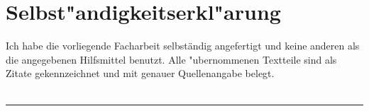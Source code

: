 \documentclass[12pt]{article}
\begin{document}
\section{Selbst"andigkeitserkl"arung}
Ich habe die vorliegende Facharbeit selbständig angefertigt und keine anderen als die angegebenen Hilfsmittel benutzt.
Alle "ubernommenen Textteile sind als Zitate gekennzeichnet und mit genauer Quellenangabe belegt. \\~\\
\rule{0.3\textwidth}{1pt}~\\
\piisignature
\end{document}

